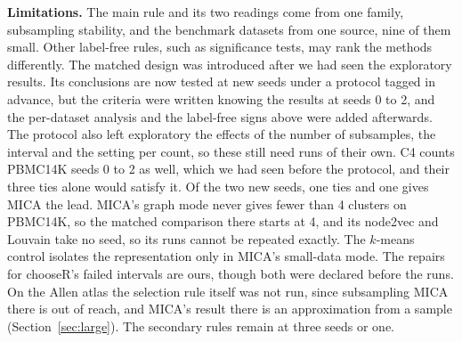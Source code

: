 \textbf{Limitations.} The main rule and its two readings come from one family, subsampling stability, and
the benchmark datasets from one source, nine of them small. Other label-free rules, such as significance tests, may rank the
methods differently. The matched design was introduced after we had seen the exploratory results. Its
conclusions are now tested at new seeds under a protocol tagged in advance, but the criteria were written
knowing the results at seeds 0 to 2, and the per-dataset analysis and the label-free signs above were
added afterwards. The protocol also left exploratory the effects of the number of subsamples, the interval
and the setting per count, so these still need runs of their own. C4 counts PBMC14K seeds 0 to 2 as well,
which we had seen before the protocol, and their three ties alone would satisfy it. Of the two new seeds,
one ties and one gives MICA the lead. MICA's graph mode never gives fewer than 4 clusters on PBMC14K, so
the matched comparison there starts at 4, and its node2vec and Louvain take no seed, so its runs cannot be
repeated exactly. The $k$-means control isolates the representation only in MICA's small-data mode. The
repairs for chooseR's failed intervals are ours, though both were declared before the runs. On the Allen
atlas the selection rule itself was not run, since subsampling MICA there is out of reach, and MICA's
result there is an approximation from a sample (Section~\ref{sec:large}). The secondary rules remain at
three seeds or one.
